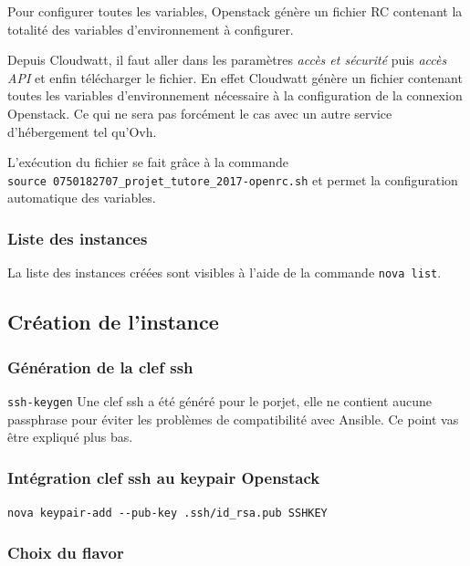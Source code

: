 \documentclass[]{article}
\begin{document}
Pour configurer toutes les variables, Openstack génère un fichier RC
contenant la totalité des variables d'environnement à configurer.

Depuis Cloudwatt, il faut aller dans les paramètres \emph{accès et
sécurité} puis \emph{accès API} et enfin télécharger le fichier. En
effet Cloudwatt génère un fichier contenant toutes les variables
d'environnement nécessaire à la configuration de la connexion Openstack.
Ce qui ne sera pas forcément le cas avec un autre service d'hébergement tel qu'Ovh.

L'exécution du fichier se fait grâce à la commande
\texttt{source\ 0750182707\_projet\_tutore\_2017-openrc.sh} et permet la
configuration automatique des variables.

\subsubsection{Liste des instances}\label{liste-des-instances}

La liste des instances créées sont visibles à l'aide de la commande
\texttt{nova\ list}.

\subsection{Création de l'instance}\label{cruxe9ation-de-linstance}

\subsubsection{Génération de la clef
ssh}\label{guxe9nuxe9ration-de-la-clef-ssh}

\texttt{ssh-keygen}
Une clef ssh a été généré pour le porjet, elle ne contient aucune passphrase pour éviter les problèmes de compatibilité avec Ansible. Ce point vas être expliqué plus bas.

\subsubsection{Intégration clef ssh au keypair
Openstack}\label{intuxe9gration-clef-ssh-au-keypair-openstack}

\texttt{nova\ keypair-add\ -\/-pub-key\ .ssh/id\_rsa.pub\ SSHKEY}

\subsubsection{Choix du flavor}\label{choix-du-flavor}
\end{document}
